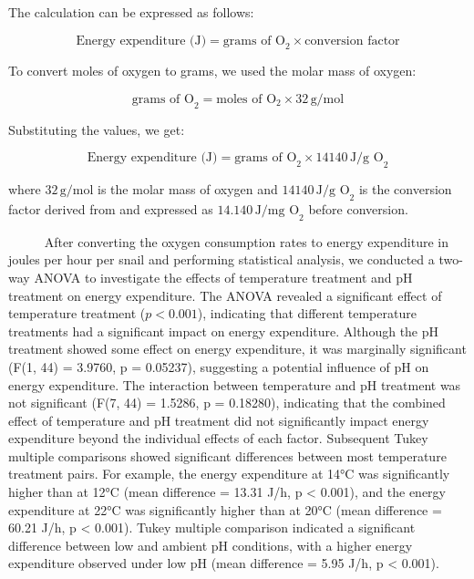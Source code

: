 \documentclass[
]{article}
\begin{document}
The calculation can be expressed as follows:

\[
\text{Energy expenditure (J)} = \text{grams of O}_2 \times \text{conversion factor}
\]

To convert moles of oxygen to grams, we used the molar mass of oxygen:

\[
\text{grams of O}_2 = \text{moles of O}_2 \times 32 \, \text{g/mol}
\]

Substituting the values, we get:

\[
\text{Energy expenditure (J)} = \text{grams of O}_2 \times 14140 \, \text{J/g O}_2
\]

where \(32 \, \text{g/mol}\) is the molar mass of oxygen and
\(14140 \, \text{J/g O}_2\) is the conversion factor derived from
\cite{elliott1975energy} and expressed as \(14.140 \, \text{J/mg O}_2\)
before conversion.

~~~~~ After converting the oxygen consumption rates to energy
expenditure in joules per hour per snail and performing statistical
analysis, we conducted a two-way ANOVA to investigate the effects of
temperature treatment and pH treatment on energy expenditure. The ANOVA
revealed a significant effect of temperature treatment (\(p < 0.001\)),
indicating that different temperature treatments had a significant
impact on energy expenditure. Although the pH treatment showed some
effect on energy expenditure, it was marginally significant (F(1, 44) =
3.9760, p = 0.05237), suggesting a potential influence of pH on energy
expenditure. The interaction between temperature and pH treatment was
not significant (F(7, 44) = 1.5286, p = 0.18280), indicating that the
combined effect of temperature and pH treatment did not significantly
impact energy expenditure beyond the individual effects of each factor.
Subsequent Tukey multiple comparisons showed significant differences
between most temperature treatment pairs. For example, the energy
expenditure at 14°C was significantly higher than at 12°C (mean
difference = 13.31 J/h, p \textless{} 0.001), and the energy expenditure
at 22°C was significantly higher than at 20°C (mean difference = 60.21
J/h, p \textless{} 0.001). Tukey multiple comparison indicated a
significant difference between low and ambient pH conditions, with a
higher energy expenditure observed under low pH (mean difference = 5.95
J/h, p \textless{} 0.001).
\end{document}
